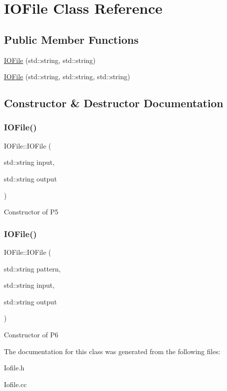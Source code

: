 \hypertarget{classIOFile}{}\section{I\+O\+File Class Reference}
\label{classIOFile}
\subsection*{Public Member Functions}
\begin{DoxyCompactItemize}
\item 
\hyperlink{classIOFile_a1a08441371c84205a8704c6ef0811792}{I\+O\+File} (std\+::string, std\+::string)
\item 
\hyperlink{classIOFile_a25f35de90baaae5b5b8553802285806b}{I\+O\+File} (std\+::string, std\+::string, std\+::string)
\end{DoxyCompactItemize}


\subsection{Constructor \& Destructor Documentation}
\mbox{\label{classIOFile_a1a08441371c84205a8704c6ef0811792}} 
\subsubsection{\texorpdfstring{I\+O\+File()}{IOFile()}\hspace{0.1cm}{\footnotesize\ttfamily [1/2]}}
{\footnotesize\ttfamily I\+O\+File\+::\+I\+O\+File (\begin{DoxyParamCaption}\item[{std\+::string}]{input,  }\item[{std\+::string}]{output }\end{DoxyParamCaption})}

Constructor of P5 \mbox{\label{classIOFile_a25f35de90baaae5b5b8553802285806b}} 
\subsubsection{\texorpdfstring{I\+O\+File()}{IOFile()}\hspace{0.1cm}{\footnotesize\ttfamily [2/2]}}
{\footnotesize\ttfamily I\+O\+File\+::\+I\+O\+File (\begin{DoxyParamCaption}\item[{std\+::string}]{pattern,  }\item[{std\+::string}]{input,  }\item[{std\+::string}]{output }\end{DoxyParamCaption})}

Constructor of P6 

The documentation for this class was generated from the following files\+:\begin{DoxyCompactItemize}
\item 
Iofile.\+h\item 
Iofile.\+cc\end{DoxyCompactItemize}
